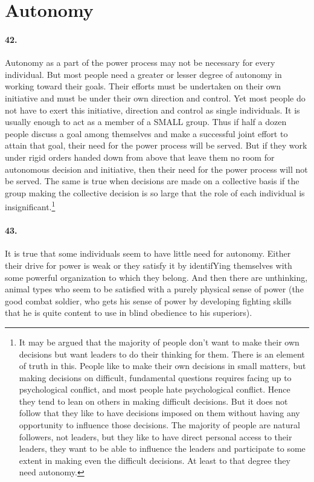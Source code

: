\documentclass[12pt]{book}
\newcommand{\mysection}[1]{\section*{#1} \addcontentsline{toc}{section}{#1}}
\begin{document}
\mysection{Autonomy}


\paragraph{42.} Autonomy as a part of the power process may not be necessary for every individual. But most people need a greater or lesser degree of autonomy in working toward their goals. Their efforts must be undertaken on their own initiative and must be under their own direction and control. Yet most people do not have to exert this initiative, direction and control as single individuals.  It is usually enough to act as a member of a SMALL group. Thus if half a dozen people discuss a goal among themselves and make a successful joint effort to attain that goal, their need for the power process will be served. But if they work under rigid orders handed down from above that leave them no room for autonomous decision and initiative, then their need for the power process will not be served. The same is true when decisions are made on a collective basis if the group making the collective decision is so large that the role of each individual is insignificant.\footnote{It may be argued that the majority of people don't want to make their own decisions but want leaders to do their thinking for them. There is an element of truth in this. People like to make their own decisions in small matters, but making decisions on difficult, fundamental questions requires facing up to psychological conflict, and most people hate psychological conflict. Hence they tend to lean on others in making difficult decisions. But it does not follow that they like to have decisions imposed on them without having any opportunity to influence those decisions. The majority of people are natural followers, not leaders, but they like to have direct personal access to their leaders, they want to be able to influence the leaders and participate to some extent in making even the difficult decisions. At least to that degree they need autonomy.}


\paragraph{43.} It is true that some individuals seem to have little need for autonomy.  Either their drive for power is weak or they satisfy it by identifYing themselves with some powerful organization to which they belong. And then there are unthinking, animal types who seem to be satisfied with a purely physical sense of power (the good combat soldier, who gets his sense of power by developing fighting skills that he is quite content to use in blind obedience to his superiors).
\end{document}
